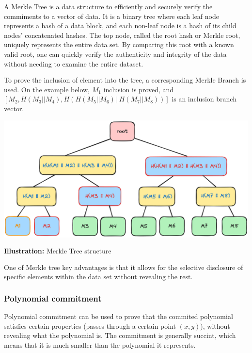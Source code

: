 \documentclass[../lecture-notes.tex]{subfiles}
\begin{document}
A Merkle Tree is a data structure to efficiently and securely verify the commiments to a vector of data. It is a binary tree where each leaf node represents a hash of a data block, and each non-leaf node is a hash of its child nodes' concatenated hashes. The top node, called the root hash or Merkle root, uniquely represents the entire data set. By comparing this root with a known valid root, one can quickly verify the authenticity and integrity of the data without needing to examine the entire dataset. 

To prove the inclusion of element into the tree, a corresponding Merkle Branch is used. On the example below, $M_1$ inclusion is proved, and 
$[M_2, H(M_3 || M_4), H(H(M_5 || M_6) || H(M_7 || M_8))]$ is an inclusion branch vector.

\begin{center}
    \centering\includegraphics[width=0.9\linewidth, clip]{images/lecture_5/MerkleTreeProof.png}

    \scriptsize{\textbf{Illustration:} Merkle Tree structure}
\end{center}

One of Merkle tree key advantages is that it allows for the selective disclosure of specific elements within the data set without revealing the rest. 

\subsubsection{Polynomial commitment}

Polynomial commitment can be used to prove that the commited polynomial satisfies certain properties (passes through a certain point $(x,y)$), without revealing what the polynomial is.
The commitment is generally succint, which means that it is much smaller than the polynomial it represents.

\vspace{0.5 cm}
\end{document}
